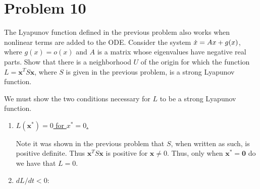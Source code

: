 \section{Problem 10}
The Lyapunov function defined in the previous problem also works when nonlinear terms are added to the ODE. Consider the system $\dot{x} = Ax + g(x)$, where $g(x) = o(x)$ and $A$ is a matrix whose eigenvalues have negative real parts. Show that there is a neighborhood $U$ of the origin for which the function $L = \textbf{x}^TS\textbf{x}$, where $S$ is given in the previous problem, is a strong Lyapunov function.
\partbreak
\begin{solution}

    We must show the two conditions necessary for $L$ to be a strong Lyapunov function. 
    \begin{enumerate}
        \item \underline{$L(\textbf{x}^*) = 0$ for $x^* = 0$.}
        
        Note it was shown in the previous problem that $S$, when written as such, is positive definite. Thus $\textbf{x}^TS\textbf{x}$ is positive for $\textbf{x}\neq 0$. Thus, only when $\textbf{x}^* = \textbf{0}$ do we have that $L = 0$. 

        \item \underline{$dL/dt < 0$}:


\end{enumerate}
\end{solution}
